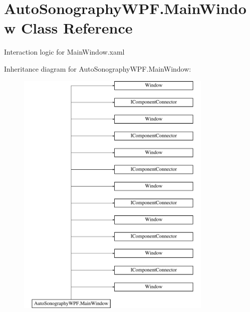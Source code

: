 \hypertarget{class_auto_sonography_w_p_f_1_1_main_window}{}\section{Auto\+Sonography\+W\+P\+F.\+Main\+Window Class Reference}
\label{class_auto_sonography_w_p_f_1_1_main_window}


Interaction logic for Main\+Window.\+xaml  


Inheritance diagram for Auto\+Sonography\+W\+P\+F.\+Main\+Window\+:\begin{figure}[H]
\begin{center}
\leavevmode
\includegraphics[height=12.000000cm]{class_auto_sonography_w_p_f_1_1_main_window}
\end{center}
\end{figure}
